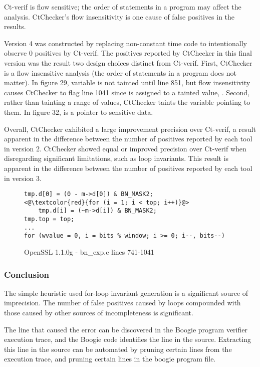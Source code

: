 Ct-verif is flow sensitive; the order of statements in a program may
affect the analysis.  CtChecker's flow insensitivity is one cause of
false positives in the results.

Version 4 was constructed by replacing non-constant time code to
intentionally observe 0 positives by Ct-verif. The positives reported
by CtChecker in this final version was the result two design choices
distinct from Ct-verif. First, CtChecker is a flow insensitive analysis
(the order of statements in a program does not matter). In figure 29,
variable  is not tainted until line 851, but flow
insensitivity causes CtChecker to flag line 1041 since  is
assigned to a tainted value, . Second, rather than
tainting a range of values, CtChecker taints the variable pointing to
them. In figure 32,  is a pointer to sensitive data.

Overall, CtChecker exhibited a large improvement precision over
Ct-verif, a result apparent in the difference between the number of
positives reported by each tool in version 2. CtChecker showed equal
or improved precision over Ct-verif when disregarding significant
limitations, such as loop invariants. This result is apparent in the
difference between the number of positives reported by each tool in
version 3.


\begin{figure}[h!]
\begin{lstlisting}
tmp.d[0] = (0 - m->d[0]) & BN_MASK2;
<@\textcolor{red}{for (i = 1; i < top; i++)}@>
    tmp.d[i] = (~m->d[i]) & BN_MASK2;
tmp.top = top;
...
for (wvalue = 0, i = bits % window; i >= 0; i--, bits--)
\end{lstlisting}
\caption{OpenSSL 1.1.0g - bn\_exp.c lines 741-1041}
\label{code:libgcrypt_normalize}
\end{figure}

\subsubsection{Conclusion}
The simple heuristic used for-loop invariant generation is a significant source of
imprecision.  The number of false positives
caused by loops compounded with those caused by other sources of incompleteness
is significant.

The line that caused the error can be discovered in the Boogie program verifier
execution trace, and the Boogie code identifies the line in the source.
Extracting this line in the source can be automated by pruning certain lines
from the execution trace, and pruning certain lines in the boogie program file.



